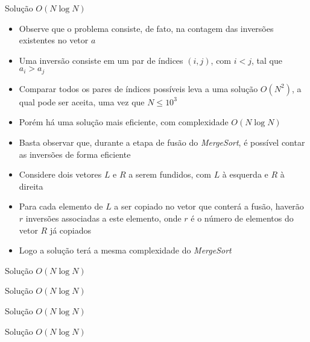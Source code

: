 \begin{frame}[fragile]{Solução $O(N\log N)$}

    \begin{itemize}
        \item Observe que o problema consiste, de fato, na contagem das inversões existentes no
            vetor $a$

        \item Uma inversão consiste em um par de índices $(i, j)$, com $i < j$, tal que
            $a_i > a_j$

        \item Comparar todos os pares de índices possíveis leva a uma solução $O(N^2)$, a qual
            pode ser aceita, uma vez que $N\leq 10^3$

        \item Porém há uma solução mais eficiente, com complexidade $O(N\log N)$

        \item Basta observar que, durante a etapa de fusão do \textit{MergeSort}, é possível
            contar as inversões de forma eficiente

        \item Considere dois vetores $L$ e $R$ a serem fundidos, com $L$ à esquerda e $R$ à direita

        \item Para cada elemento de $L$ a ser copiado no vetor que conterá a fusão, haverão
            $r$ inversões associadas a este elemento, onde $r$ é o número de elementos do
            vetor $R$ já copiados 

        \item Logo a solução terá a mesma complexidade do \textit{MergeSort}
   \end{itemize}

\end{frame}

\begin{frame}[fragile]{Solução $O(N\log N)$}
\end{frame}

\begin{frame}[fragile]{Solução $O(N\log N)$}
\end{frame}

\begin{frame}[fragile]{Solução $O(N\log N)$}
\end{frame}

\begin{frame}[fragile]{Solução $O(N\log N)$}
\end{frame}
